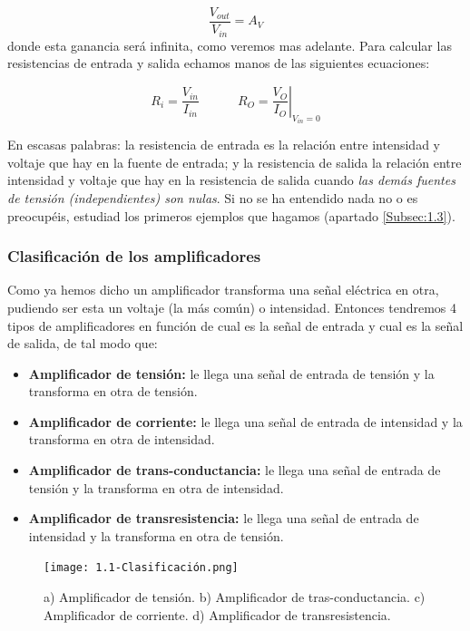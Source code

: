 \documentclass[12pt,a4paper]{article}
\numberwithin{equation}{section}
\numberwithin{figure}{section}
\newcommand{\tquad}{\quad \quad \quad}
\begin{document}
\begin{equation}
\dfrac{V_{out}}{V_{in}} = A_V
\end{equation}
donde esta ganancia será infinita, como veremos mas adelante. Para calcular las resistencias de entrada y salida echamos manos de las siguientes ecuaciones:

\begin{equation}
R_i = \dfrac{V_{in}}{I_{in}} \tquad R_O = \left. \dfrac{V_O}{I_O} \right|_{V_{in}=0}
\end{equation}

En escasas palabras: la resistencia de entrada es la relación entre intensidad y voltaje que hay en la fuente de entrada; y la resistencia de salida la relación entre intensidad y voltaje que hay en la resistencia de salida cuando \textit{las demás fuentes de tensión (independientes) son nulas}. Si no se ha entendido nada no o es preocupéis, estudiad los primeros ejemplos que hagamos (apartado \ref{Subsec:1.3}).



\subsubsection{Clasificación de los amplificadores}

Como ya hemos dicho un amplificador transforma una señal eléctrica en otra, pudiendo ser esta un voltaje (la más común) o intensidad. Entonces tendremos 4 tipos de amplificadores en función de cual es la señal de entrada y cual es la señal de salida, de tal modo que:


\begin{itemize}
\item \textbf{Amplificador de tensión:} le llega una señal de entrada de tensión y la transforma en otra de tensión.
\item \textbf{Amplificador de corriente:} le llega una señal de entrada de intensidad y la transforma en otra de intensidad.
\item \textbf{Amplificador de trans-conductancia:} le llega una señal de entrada de tensión y la  transforma en otra de intensidad.
\item \textbf{Amplificador de transresistencia:} le llega una señal de entrada de intensidad y la transforma en otra de tensión.
\end{itemize}


\begin{figure}[h!] \centering
\texttt{[image: 1.1-Clasificación.png]}
\caption{a) Amplificador de tensión. b) Amplificador de tras-conductancia. c) Amplificador de corriente. d) Amplificador de transresistencia.}
\label{Fig:1.1-Clasificaion}
\end{figure}
\end{document}
